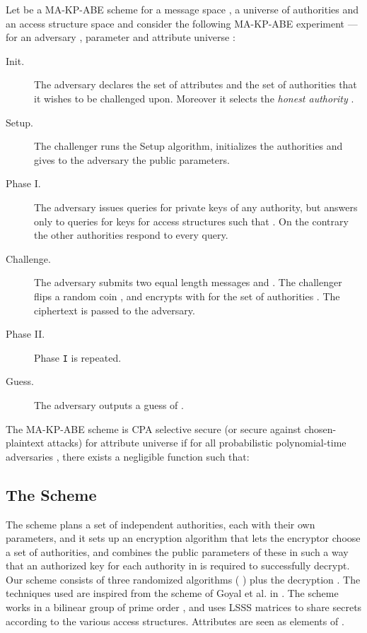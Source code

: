   \noindent Let  be a MA-KP-ABE scheme for a message space , a universe of authorities  and an access structure space  and consider the following MA-KP-ABE experiment ---  for an adversary , parameter  and attribute universe :
 \begin{description}
      \item [Init.]
        The adversary declares the set of attributes  and the set of authorities  that it wishes to be challenged upon. Moreover it selects the \textit{honest authority} .
      \item [Setup.]
        The challenger runs the Setup algorithm, initializes the authorities and gives to the adversary the public parameters.
      \item [Phase I.]
        The adversary issues queries for private keys of any authority, but  answers only to queries for keys for access structures  such that .
        On the contrary the other authorities respond to every query.
      \item [Challenge.]
        The adversary submits two equal length messages  and .
        The challenger flips a random coin , and encrypts  with  for the set of authorities .
        The ciphertext is passed to the adversary.
      \item [Phase II.]
        Phase \texttt{I} is repeated.
      \item [Guess.]
        The adversary outputs a guess  of .
  \end{description}


  \begin{definition}
  The MA-KP-ABE scheme  is  CPA selective secure (or secure against   chosen-plaintext attacks) for attribute universe  if for all probabilistic polynomial-time adversaries , there exists a negligible function  such that:
  
  \end{definition}

\subsection{The Scheme}
  The scheme plans a set  of independent authorities, each with their own pa\-ra\-me\-ters, and it sets up an encryption algorithm that lets the encryptor choose a set  of authorities, and combines the public parameters of these in such a way that an authorized key for each authority in  is required to successfully decrypt.\\
  Our scheme consists of three randomized algorithms ( ) plus the decryption .
  The techniques used are inspired from the scheme of Goyal et al. in \cite{goyal2006attribute}.
  The scheme works in a bilinear group  of prime order , and uses LSSS matrices to share secrets according to the various access structures.
  Attributes are seen as elements of .

